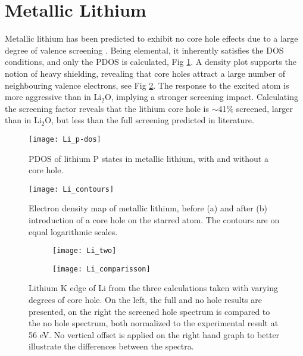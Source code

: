 \section{Metallic Lithium}
Metallic lithium has been predicted to exhibit no core hole effects due to a large degree of valence screening \cite{rez_theory_2008, lru_electron-energy-loss_1986, egerton_electron_1987}. Being elemental, it inherently satisfies the DOS conditions, and only the PDOS is calculated, Fig \ref{li_dos}. A density plot supports the notion of heavy shielding, revealing that core  holes attract a large number of neighbouring valence electrons, see Fig \ref{Li_countours}.  The response to the excited atom is more aggressive than in $ \mathrm{Li_2O} $, implying a stronger screening impact.  Calculating the screening factor  reveals that the lithium core hole is  $ \sim$41\% screened, larger than in $ \mathrm{Li_2O} $, but less than the full screening predicted in literature. 
\\


\begin{figure}
	\centering
	\texttt{[image: Li\_p-dos]}
	\caption{PDOS of lithium P states in metallic lithium, with and without a core hole.}
	\label{li_dos}
\end{figure}

\begin{figure}
	\centering
	\texttt{[image: Li\_contours]}
	\caption{Electron density map of metallic lithium, before (a) and after (b) introduction of a core hole on the starred atom.  The contours are on equal logarithmic scales.}
	\label{Li_countours}
\end{figure}




\begin{figure}
	\centering
	\begin{subfigure}{0.45\textwidth}
		\texttt{[image: Li\_two]}
	\end{subfigure}
	\hspace{-0.01cm}
	\begin{subfigure}{0.45\textwidth}
		\texttt{[image: Li\_comparisson]}
	\end{subfigure}

	\caption{Lithium K edge of Li from the three calculations taken with varying degrees of core hole. On the left, the full and no hole results are presented, on the right the screened hole spectrum is compared to the no hole spectrum, both normalized to the experimental result at 56 eV. No vertical offset is applied on the right hand graph to better illustrate the differences between the spectra. }
	\label{Li_spectra}
\end{figure}


